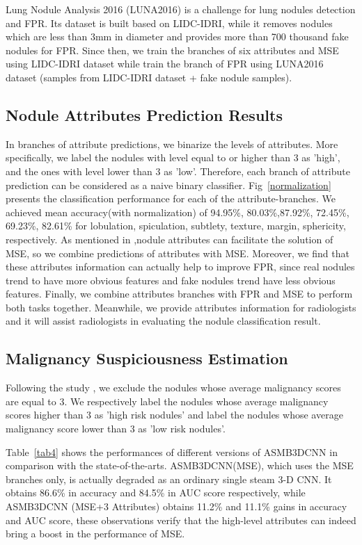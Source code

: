 \documentclass[runningheads]{llncs}
\begin{document}
Lung Nodule Analysis 2016 (LUNA2016) \cite{Aaa2016Validation} is a challenge for lung nodules detection and FPR. Its dataset is built based on LIDC-IDRI, while it removes nodules which are less than 3mm in diameter and provides more than 700 thousand fake nodules for FPR. Since then, we train the branches of six attributes and MSE using LIDC-IDRI dataset while train the branch of FPR using LUNA2016 dataset (samples from LIDC-IDRI dataset + fake nodule samples).


\subsection{Nodule Attributes Prediction Results}
In branches of attribute predictions, we binarize the  levels of attributes. More specifically, we label the nodules with level equal to or higher than 3 as 'high', and the ones with level lower than 3 as 'low'. Therefore, each branch of attribute prediction can be considered as a naive binary classifier.
Fig~\ref{normalization} presents the classification performance for each of the attribute-branches. We achieved mean accuracy(with normalization) of 94.95\%, 80.03\%,87.92\%, 72.45\%, 69.23\%, 82.61\% for lobulation, spiculation, subtlety, texture, margin, sphericity, respectively. As mentioned in \cite{Hussein2017Risk},nodule attributes can facilitate the solution of MSE, so we combine predictions of attributes with MSE.  Moreover, we find that these attributes information can actually help to improve FPR, since real nodules trend to have more obvious features and fake nodules trend have less obvious features. Finally, we combine attributes branches with FPR and MSE to perform both tasks together.
Meanwhile, we provide attributes information for radiologists and it will assist radiologists in evaluating the nodule classification result.


\subsection{Malignancy Suspiciousness Estimation}
\label{MSE}
Following the study \cite{Shen2017Multi}\cite{Causey2018Highly}, we exclude the nodules whose average malignancy scores are equal to 3. We respectively label the nodules whose average malignancy scores higher than 3 as 'high risk nodules' and  label the nodules whose average malignancy score lower than 3 as 'low risk nodules'.

Table~\ref{tab4} shows the performances of different versions of ASMB3DCNN in comparison with the state-of-the-arts. ASMB3DCNN(MSE), which uses the MSE branches only, is actually degraded as an ordinary single steam 3-D CNN. It obtains 86.6\% in accuracy and 84.5\% in AUC score respectively, while ASMB3DCNN (MSE+3  Attributes)  obtains 11.2\% and 11.1\% gains in accuracy and AUC score, these observations verify that the high-level attributes can indeed bring a boost in the performance of MSE.
\end{document}
